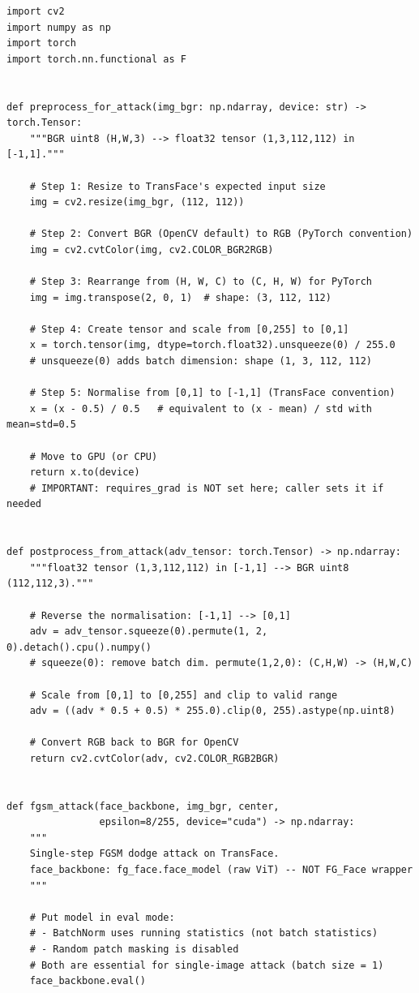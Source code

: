 \documentclass[12pt,a4paper]{article}
\begin{document}
\begin{lstlisting}[caption={attacks/fgsm.py -- Complete listing with line-by-line explanation}]
import cv2
import numpy as np
import torch
import torch.nn.functional as F


def preprocess_for_attack(img_bgr: np.ndarray, device: str) -> torch.Tensor:
    """BGR uint8 (H,W,3) --> float32 tensor (1,3,112,112) in [-1,1]."""

    # Step 1: Resize to TransFace's expected input size
    img = cv2.resize(img_bgr, (112, 112))

    # Step 2: Convert BGR (OpenCV default) to RGB (PyTorch convention)
    img = cv2.cvtColor(img, cv2.COLOR_BGR2RGB)

    # Step 3: Rearrange from (H, W, C) to (C, H, W) for PyTorch
    img = img.transpose(2, 0, 1)  # shape: (3, 112, 112)

    # Step 4: Create tensor and scale from [0,255] to [0,1]
    x = torch.tensor(img, dtype=torch.float32).unsqueeze(0) / 255.0
    # unsqueeze(0) adds batch dimension: shape (1, 3, 112, 112)

    # Step 5: Normalise from [0,1] to [-1,1] (TransFace convention)
    x = (x - 0.5) / 0.5   # equivalent to (x - mean) / std with mean=std=0.5

    # Move to GPU (or CPU)
    return x.to(device)
    # IMPORTANT: requires_grad is NOT set here; caller sets it if needed


def postprocess_from_attack(adv_tensor: torch.Tensor) -> np.ndarray:
    """float32 tensor (1,3,112,112) in [-1,1] --> BGR uint8 (112,112,3)."""

    # Reverse the normalisation: [-1,1] --> [0,1]
    adv = adv_tensor.squeeze(0).permute(1, 2, 0).detach().cpu().numpy()
    # squeeze(0): remove batch dim. permute(1,2,0): (C,H,W) -> (H,W,C)

    # Scale from [0,1] to [0,255] and clip to valid range
    adv = ((adv * 0.5 + 0.5) * 255.0).clip(0, 255).astype(np.uint8)

    # Convert RGB back to BGR for OpenCV
    return cv2.cvtColor(adv, cv2.COLOR_RGB2BGR)


def fgsm_attack(face_backbone, img_bgr, center,
                epsilon=8/255, device="cuda") -> np.ndarray:
    """
    Single-step FGSM dodge attack on TransFace.
    face_backbone: fg_face.face_model (raw ViT) -- NOT FG_Face wrapper
    """

    # Put model in eval mode:
    # - BatchNorm uses running statistics (not batch statistics)
    # - Random patch masking is disabled
    # Both are essential for single-image attack (batch size = 1)
    face_backbone.eval()


\end{lstlisting}
\end{document}
